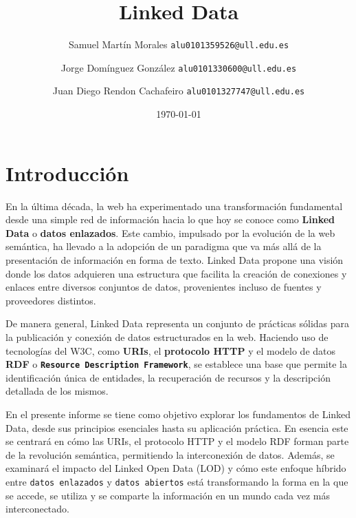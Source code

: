 \documentclass[11pt]{report}
\begin{document}

\title{Linked Data}
\author{Samuel Martín Morales  \texttt{alu0101359526@ull.edu.es} \and Jorge Domínguez González  \texttt{alu0101330600@ull.edu.es} \and Juan Diego Rendon Cachafeiro \texttt{alu0101327747@ull.edu.es}}
\date{\today}

\maketitle

\tableofcontents

\chapter{Introducción}

En la última década, la web ha experimentado una transformación fundamental desde una simple red de información hacia lo que hoy se conoce como \textbf{Linked Data} o \textbf{datos enlazados}. Este cambio, impulsado por la evolución de la web semántica, ha llevado a la adopción de un paradigma que va más allá de la  presentación de información en forma de texto. Linked Data propone una visión donde los datos adquieren una estructura que facilita la creación de conexiones y enlaces entre diversos conjuntos de datos, provenientes incluso de fuentes y proveedores distintos.

De manera general, Linked Data representa un conjunto de prácticas sólidas para la publicación y conexión de datos estructurados en la web. Haciendo uso de tecnologías del W3C, como \textbf{URIs}, el \textbf{protocolo HTTP} y el modelo de datos \textbf{RDF} o \texttt{\textbf{Resource Description Framework}}, se establece una base que permite la identificación única de entidades, la recuperación de recursos y la descripción detallada de los mismos.

En el presente informe se tiene como objetivo explorar los fundamentos de Linked Data, desde sus principios esenciales hasta su aplicación práctica. En esencia este se centrará en cómo las URIs, el protocolo HTTP y el modelo RDF forman parte de la revolución semántica, permitiendo la interconexión de datos. Además, se examinará el impacto del Linked Open Data (LOD) y cómo este enfoque híbrido entre \texttt{datos enlazados} y \texttt{datos abiertos} está transformando la forma en la que se accede, se utiliza y se comparte la información en un mundo cada vez más interconectado.
\end{document}

